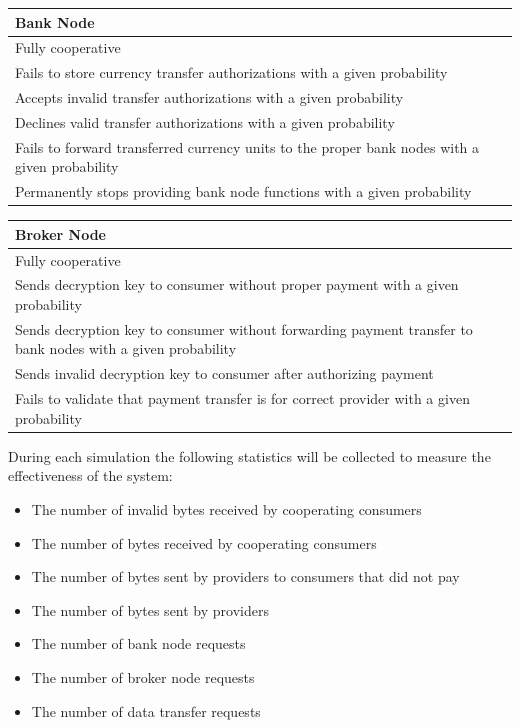 \documentclass[%
				10pt,
        final,
        notitlepage,
        narroweqnarray,
        inline,
        twoside,
        ]{ieee}
\begin{document}
\begin{center}
  \begin{tabular}{ p{6.25cm} }
    \bf Bank Node \\ \hline
    \hline
    Fully cooperative \\ \hline
    Fails to store currency transfer authorizations with a given probability \\ \hline
    Accepts invalid transfer authorizations with a given probability \\ \hline
    Declines valid transfer authorizations with a given probability \\ \hline
    Fails to forward transferred currency units to the proper bank nodes with a given probability \\ \hline
    Permanently stops providing bank node functions with a given probability \\ \hline
  \end{tabular}
\end{center}

\begin{center}
  \begin{tabular}{ p{6.25cm} }
    \bf Broker Node \\ \hline
    \hline
    Fully cooperative \\ \hline
    Sends decryption key to consumer without proper payment with a given probability \\ \hline
    Sends decryption key to consumer without forwarding payment transfer to bank nodes with a given probability \\ \hline
    Sends invalid decryption key to consumer after authorizing payment \\ \hline
    Fails to validate that payment transfer is for correct provider with a given probability \\ \hline
  \end{tabular}
\end{center}


During each simulation the following statistics will be collected to measure the effectiveness of the system:

\begin{itemize}
\item The number of invalid bytes received by cooperating consumers
\item The number of bytes received by cooperating consumers
\item The number of bytes sent by providers to consumers that did not pay
\item The number of bytes sent by providers
\item The number of bank node requests
\item The number of broker node requests
\item The number of data transfer requests
\end{itemize}
\end{document}
